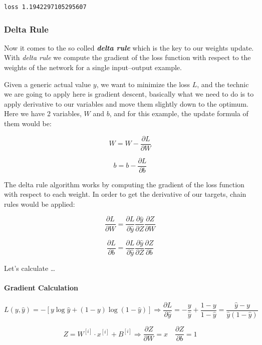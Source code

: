 \documentclass[11pt]{article}
\begin{document}
    \begin{Verbatim}[commandchars=\\\{\}]
loss 1.1942297105295607
    \end{Verbatim}

    \hypertarget{delta-rule}{%
\subsubsection{Delta Rule}\label{delta-rule}}

Now it comes to the so colled \textbf{\emph{delta rule}} which is the
key to our weights update. With \emph{delta rule} we compute the
gradient of the loss function with respect to the weights of the network
for a single input--output example.

Given a generic actual value \(y\), we want to minimize the loss \(L\),
and the technic we are going to apply here is gradient descent,
basically what we need to do is to apply derivative to our variables and
move them slightly down to the optimum. Here we have 2 variables, \(W\)
and \(b\), and for this example, the update formula of them would be:

\[W = W - \frac{\partial L}{\partial W}\]

\[b = b - \frac{\partial L}{\partial b}\]

The delta rule algorithm works by computing the gradient of the loss
function with respect to each weight. In order to get the derivative of
our targets, chain rules would be applied:

\[\frac{\partial L}{\partial W} =  \frac{\partial L}{\partial \hat y} \frac{\partial \hat y}{\partial Z} \frac{\partial Z}{\partial W} \]

\[\frac{\partial L}{\partial b} =  \frac{\partial L}{\partial \hat y} \frac{\partial \hat y}{\partial Z} \frac{\partial Z}{\partial b} \]

Let's calculate \ldots{}

\hypertarget{gradient-calculation}{%
\paragraph{Gradient Calculation}\label{gradient-calculation}}

\[L(y, \hat{y}) = -[y\log{\hat{y}} + (1 - y)\log{(1 - \hat{y})}] \Rightarrow 
\frac{\partial L}{\partial \hat y} = -\frac{y}{\hat y} + \frac{1-y}{1-\hat y} = \frac{\hat y - y}{\hat y(1 - \hat y)}\]

\[ Z = W^{[i]} \cdot x^{[i]} + B^{[i]} \Rightarrow \frac{\partial Z}{\partial W} = x \quad \frac{\partial Z}{\partial b} = 1\]
\end{document}
